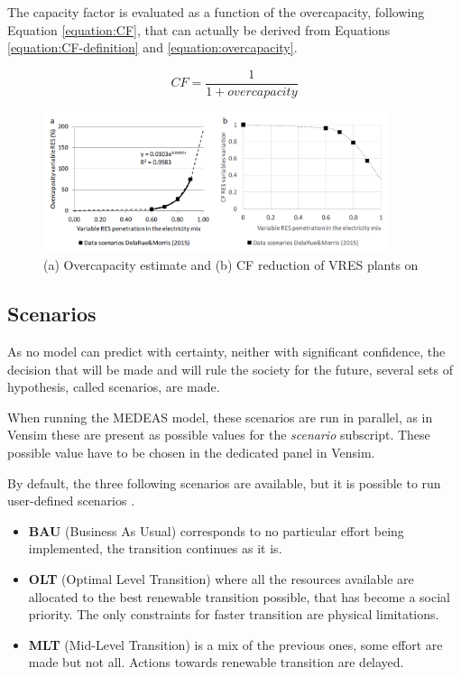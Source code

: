 The capacity factor is evaluated as a function of the overcapacity, following Equation \ref{equation:CF}, that can actually be derived from Equations \ref{equation:CF-definition} and \ref{equation:overcapacity}.

\begin{equation}
    CF=\frac{1}{1+overcapacity}
    \label{equation:CF}
\end{equation}

\begin{figure}[h]
    \includegraphics[width=0.9\textwidth]{resources/images/vres-impact-estimate.png}
    \caption{(a) Overcapacity estimate and (b) CF reduction of VRES plants on \cite{medeas-eroi}}
    \label{fig:vres-overcapacities}
\end{figure}

\subsection{Scenarios} \label{section:medeas-scenarios}

As no model can predict with certainty, neither with significant confidence, the decision that will be made and will rule the society for the future, several sets of hypothesis, called scenarios, are made.

When running the MEDEAS model, these scenarios are run in parallel, as in Vensim these are present as possible values for the \textit{scenario} subscript. These possible value have to be chosen in the dedicated panel in Vensim.

By default, the three following scenarios are available, but it is possible to run user-defined scenarios \cite{medeas-website}.

\begin{itemize}
    \item \textbf{BAU} (Business As Usual) corresponds to no particular effort being implemented, the transition continues as it is.
    \item \textbf{OLT} (Optimal Level Transition) where all the resources available are allocated to the best renewable transition possible, that has become a social priority. The only constraints for faster transition are physical limitations.
    \item \textbf{MLT} (Mid-Level Transition) is a mix of the previous ones, some effort are made but not all. Actions towards renewable transition are delayed.
\end{itemize}

